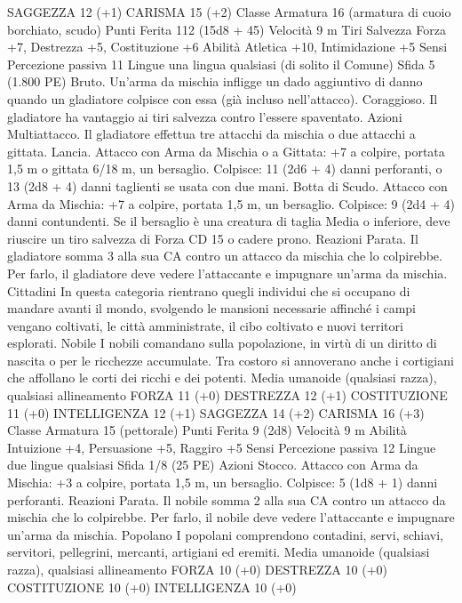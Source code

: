 \begin{multicols}{2}
SAGGEZZA 12 (+1)
CARISMA 15 (+2)
Classe Armatura 16 (armatura di cuoio borchiato, scudo)
Punti Ferita 112 (15d8 + 45)
Velocità 9 m
Tiri Salvezza Forza +7, Destrezza +5, Costituzione +6
Abilità Atletica +10, Intimidazione +5
Sensi Percezione passiva 11
Lingue una lingua qualsiasi (di solito il Comune)
Sfida 5 (1.800 PE)
Bruto. Un’arma da mischia infligge un dado aggiuntivo di danno
quando un gladiatore colpisce con essa (già incluso nell’attacco).
Coraggioso. Il gladiatore ha vantaggio ai tiri salvezza contro
l’essere spaventato.
Azioni
Multiattacco. Il gladiatore effettua tre attacchi da mischia o due
attacchi a gittata.
Lancia. Attacco con Arma da Mischia o a Gittata: +7 a colpire,
portata 1,5 m o gittata 6/18 m, un bersaglio.
Colpisce: 11 (2d6 + 4) danni perforanti, o 13 (2d8 + 4) danni
taglienti se usata con due mani.
Botta di Scudo. Attacco con Arma da Mischia: +7 a colpire,
portata 1,5 m, un bersaglio.
Colpisce: 9 (2d4 + 4) danni contundenti. Se il bersaglio è una
creatura di taglia Media o inferiore, deve riuscire un tiro salvezza
di Forza CD 15 o cadere prono.
Reazioni
Parata. Il gladiatore somma 3 alla sua CA contro un attacco da
mischia che lo colpirebbe. Per farlo, il gladiatore deve vedere
l’attaccante e impugnare un’arma da mischia.
Cittadini
In questa categoria rientrano quegli individui che si
occupano di mandare avanti il mondo, svolgendo le
mansioni necessarie affinché i campi vengano coltivati,
le città amministrate, il cibo coltivato e nuovi territori
esplorati.
Nobile
I nobili comandano sulla popolazione, in virtù di un
diritto di nascita o per le ricchezze accumulate. Tra
costoro si annoverano anche i cortigiani che affollano le
corti dei ricchi e dei potenti.
Media umanoide (qualsiasi razza), qualsiasi allineamento
FORZA 11 (+0)
DESTREZZA 12 (+1)
COSTITUZIONE 11 (+0)
INTELLIGENZA 12 (+1)
SAGGEZZA 14 (+2)
CARISMA 16 (+3)
Classe Armatura 15 (pettorale)
Punti Ferita 9 (2d8)
Velocità 9 m
Abilità Intuizione +4, Persuasione +5, Raggiro +5
Sensi Percezione passiva 12
Lingue due lingue qualsiasi
Sfida 1/8 (25 PE)
Azioni
Stocco. Attacco con Arma da Mischia: +3 a colpire, portata 1,5
m, un bersaglio.
Colpisce: 5 (1d8 + 1) danni perforanti.
Reazioni
Parata. Il nobile somma 2 alla sua CA contro un attacco da
mischia che lo colpirebbe. Per farlo, il nobile deve vedere
l’attaccante e impugnare un’arma da mischia.
Popolano
I popolani comprendono contadini, servi, schiavi,
servitori, pellegrini, mercanti, artigiani ed eremiti.
Media umanoide (qualsiasi razza), qualsiasi allineamento
FORZA 10 (+0)
DESTREZZA 10 (+0)
COSTITUZIONE 10 (+0)
INTELLIGENZA 10 (+0)

\end{multicols}
